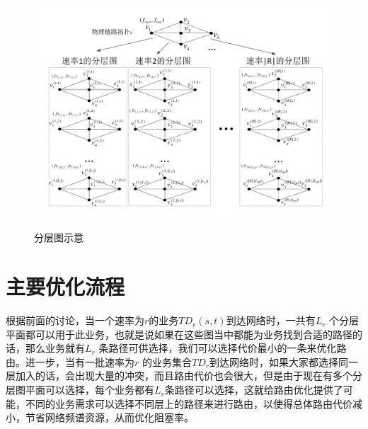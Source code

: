 \begin{figure}
\setlength{\belowcaptionskip}{-0.5cm}
\begin{center}
{\includegraphics[width=1 \textwidth]{figures/LAYER.pdf}}
\end{center}
\caption{{\footnotesize{分层图示意}}}
\label{layer}
\end{figure}
\section{主要优化流程}
根据前面的讨论，当一个速率为$r$的业务$TD_r(s,t)$到达网络时，一共有$L_r$ 个分层平面都可以用于此业务，也就是说如果在这些图当中都能为业务找到合适的路径的话，那么业务就有$L_r$ 条路径可供选择，我们可以选择代价最小的一条来优化路由。进一步，当有一批速率为$r$ 的业务集合$TD_r$到达网络时，如果大家都选择同一层加入的话，会出现大量的冲突，而且路由代价也会很大，但是由于现在有多个分层图平面可以选择，每个业务都有$L_r$条路径可以选择，这就给路由优化提供了可能，不同的业务需求可以选择不同层上的路径来进行路由，以使得总体路由代价减小，节省网络频谱资源，从而优化阻塞率。


